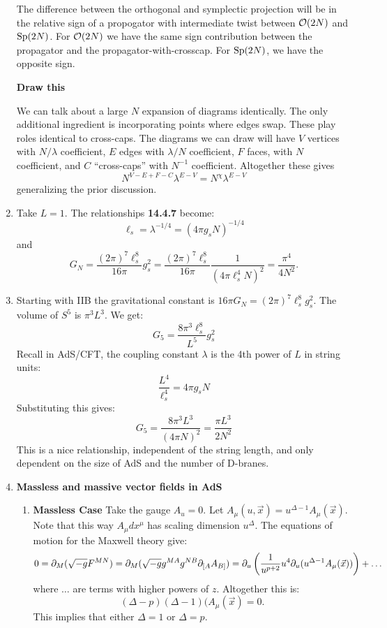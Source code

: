 \documentclass[11pt, class=article, crop=false]{standalone}
\begin{document}
\begin{enumerate}
	The difference between the orthogonal and symplectic projection will be in the relative sign of a propogator with intermediate twist between $\mathcal{O}(2N)$ and $\mathrm{Sp}(2N)$. For $\mathcal{O}(2N)$ we have the same sign contribution between the propagator and the propagator-with-crosscap. For $\mathrm{Sp}(2N)$, we have the opposite sign.
	
	\textbf{Draw this}
	
	We can talk about a large $N$ expansion of diagrams identically. The only additional ingredient is incorporating points where edges swap. These play roles identical to cross-caps. The diagrams we can draw will have $V$ vertices with $N/\lambda$ coefficient, $E$ edges with $\lambda/N$ coefficient, $F$ faces, with $N$ coefficient, and $C$ ``cross-caps'' with $N^{-1}$ coefficient. Altogether these gives 
	\[
		N^{V-E+F-C} \lambda^{E-V} = N^{\chi} \lambda^{E-V}
	\]
	generalizing the prior discussion.
	
	\item Take $L = 1$. The relationships \textbf{14.4.7} become:
	\[
		\ell_s = \lambda^{-1/4} = (4 \pi g_s N)^{-1/4}
	\]
	and
	\[
		G_N = \frac{(2 \pi)^7 \ell_s^8}{16 \pi} g_s^2 = \frac{(2 \pi)^7 \ell_s^8}{16 \pi} \frac{1}{(4 \pi \ell_s^4 N)^2} = \frac{\pi^4}{4 N^2}.
	\]
	
	\item 
	 Starting with IIB the gravitational constant is $16 \pi G_N = (2\pi)^7 \ell_s^8 g_s^2$. The volume of $S^5$ is $\pi^3 L^3$. We get:
	 \[
	 	G_5 = \frac{8 \pi^3 \ell_s^8}{L^5} g_s^2
	 \]
	 Recall in AdS/CFT, the coupling constant $\lambda$ is the 4th power of $L$ in string units: 
	 	\[
	 		\frac{L^4}{\ell_s^4} = 4 \pi g_s N
	 	\]
		Substituting this gives:
		\[
			G_5 = \frac{8 \pi^3 L^3}{(4 \pi N)^2} = \frac{\pi L^3}{2 N^2}
		\]
		This is a nice relationship, independent of the string length, and only dependent on the size of AdS and the number of D-branes. 
	
	\item \textbf{Massless and massive vector fields in AdS}
	\begin{enumerate}
		\item \textbf{Massless Case} Take the gauge $A_u = 0$. Let $A_\mu (u, \vec x) = u^{\Delta - 1} A_\mu (\vec x)$. Note that this way $A_\mu dx^\mu$ has scaling dimension $u^\Delta$. The equations of motion for the Maxwell theory give:
		\[
			0 = \partial_M (\sqrt{-g} F^{MN}) = \partial_M (\sqrt{-g} g^{M A} g^{N B} \partial_{\small[ A} A_{B\small]}) = \partial_{u} \left( \frac{1}{u^{p+2}} u^{4} \partial_{u} (u^{\Delta-1} A_\mu(\vec x)) \right) + \dots
		\]
		 where $\dots$ are terms with higher powers of $z$. Altogether this is:
		 \[
		 	(\Delta - p)(\Delta - 1) (A_\mu (\vec x) = 0.
		 \]
		 This implies that either $\Delta = 1$ or $\Delta = p$.
		 

\end{enumerate}
\end{enumerate}
\end{document}

